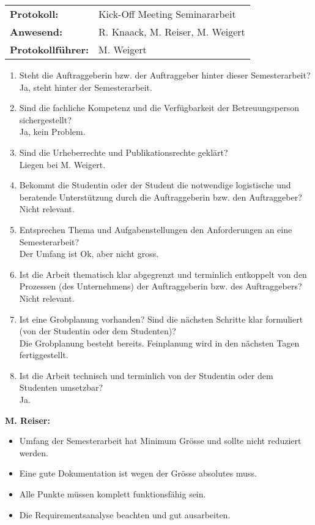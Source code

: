 \begin{tabular}{ll}
	\textbf{Protokoll:} & Kick-Off Meeting Seminararbeit \\
	\textbf{Anwesend:} & R. Knaack, M. Reiser, M. Weigert \\
	\textbf{Protokollführer:} & M. Weigert \\
\end{tabular}

\begin{enumerate}
	\item Steht die Auftraggeberin bzw. der Auftraggeber hinter dieser Semesterarbeit? \\
	{\color{DarkSlateBlue}Ja, steht hinter der Semesterarbeit.}
	\item Sind die fachliche Kompetenz und die Verfügbarkeit der Betreuungsperson sichergestellt? \\
	{\color{DarkSlateBlue}Ja, kein Problem.}
	\item Sind die Urheberrechte und Publikationsrechte geklärt? \\
	{\color{DarkSlateBlue}Liegen bei M. Weigert.}
	\item Bekommt die Studentin oder der Student die notwendige logistische und beratende Unterstützung
	durch die Auftraggeberin bzw. den Auftraggeber? \\
	{\color{DarkSlateBlue}Nicht relevant.}
	\item Entsprechen Thema und Aufgabenstellungen den Anforderungen an eine Semesterarbeit? \\
	{\color{DarkSlateBlue}Der Umfang ist Ok, aber nicht gross.}
	\item Ist die Arbeit thematisch klar abgegrenzt und terminlich entkoppelt von den Prozessen
	(des Unternehmens) der Auftraggeberin bzw. des Auftraggebers? \\
	{\color{DarkSlateBlue}Nicht relevant.}
	\item Ist eine Grobplanung vorhanden? Sind die nächsten Schritte klar formuliert (von der
	Studentin oder dem Studenten)? \\
	{\color{DarkSlateBlue}Die Grobplanung besteht bereits. Feinplanung wird in den nächsten Tagen fertiggestellt.}
	\item Ist die Arbeit technisch und terminlich von der Studentin oder dem Studenten umsetzbar? \\
	{\color{DarkSlateBlue}Ja.}
\end{enumerate}

\textbf{M. Reiser:}
\begin{itemize}
	\item Umfang der Semesterarbeit hat Minimum Grösse und sollte nicht reduziert werden.
	\item Eine gute Dokumentation ist wegen der Grösse absolutes muss.
	\item Alle Punkte müssen komplett funktionsfähig sein.
	\item Die Requirementsanalyse beachten und gut ausarbeiten.
\end{itemize}

